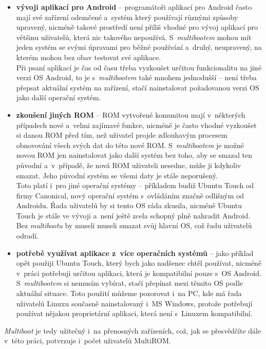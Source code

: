 \documentclass[12pt, a4paper, oneside]{article}
\newcommand{\B}{\textbf} %
\newcommand{\It}{\textit}  %
\begin{document}
\begin{itemize}
    \item \B{vývoji aplikací pro Android} -- programátoři aplikací pro Android často mají své zařízení odemčené a~systém který používají různými způsoby upravený, nicméně takové prostředí není příliš vhodné pro vývoj aplikací pro většinu uživatelů, která nic takového nepoužívá. S~\It{multibootem} mohou mít jeden systém se svými úpravami pro běžné používání a~druhý, neupravený, na kterém mohou bez obav testovat své aplikace. \\
    Při psaní aplikací je čas od času třeba vyzkoušet určitou funkcionalitu na jiné verzi OS Android, to je s~\It{multibootem} také mnohem jednodušší -- není třeba přepsat aktuální systém na zařízení, stačí nainstalovat požadovanou verzi OS jako další operační systém.

    \item \B{zkoušení jiných ROM} -- ROM vytvořené komunitou mají v~některých případech nové a~velmi zajímavé funkce, nicméně je často vhodné vyzkoušet si danou ROM před tím, než uživatel projde zdlouhavým procesem obnovování všech svých dat do této nové ROM. S~\It{multibootem} je možné novou ROM jen nainstalovat jako další systém bez toho, aby se smazal ten původní a~v~případě, že nová ROM uživateli nesedne, může ji kdykoliv smazat. Jeho původní systém se všemi daty je stále neporušený.\\
    Toto platí i~pro jiné operační systémy -- příkladem budiž Ubuntu Touch od firmy Canonical, nový operační systém s~ovládáním značně odlišným od Androidu. Řada uživatelů by si tento OS ráda zkusila, nicméně Ubuntu Touch je stále ve vývoji a~není ještě zcela schopný plně nahradit Android. Bez \It{multibootu} by museli museli smazat svůj hlavní OS, což řadu uživatelů odradí.

    \item \B{potřebě využívat aplikace z~více operačních systémů} -- jako příklad opět použiji Ubuntu Touch, který bych jako nadšenec chtěl používat, nicméně v~práci potřebuji určitou aplikaci, která je kompatibilní pouze s~OS Android. S~\It{multibootem} si nemusím vybírat, stačí přepínat mezi těmito OS podle aktuální situace. Toto použití můžeme pozorovat i~na PC, kde má řada uživatelů Linuxu současně nainstalovaný i~MS Windows, protože potřebují používat nějakou proprietární aplikaci, která není s~Linuxem kompatibilní.
\end{itemize}

\noindent \It{Multiboot} je tedy užitečný i~na přenosných zařízeních, což, jak se přesvědčíte dále v~této práci, potvrzuje i~počet uživatelů MultiROM.
\end{document}

